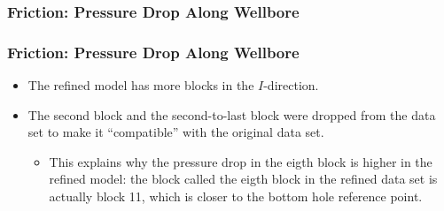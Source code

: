 \begin{frame}
    \frametitle{Friction: Pressure Drop Along Wellbore}
    \centerline{}
\end{frame}

\begin{frame}
    \frametitle{Friction: Pressure Drop Along Wellbore}
    \centerline{}
\end{frame}
\begin{frame}
    \begin{itemize}
        \item The refined model has more blocks in the $I$-direction.
        \item The second block and the second-to-last block were dropped from the data set to make it ``compatible'' with the original data set.
        \begin{itemize}
            \item This explains why the pressure drop in the eigth block is higher in the refined model: the block called the eigth block in the refined data set is actually block 11, which is closer to the bottom hole reference point.
        \end{itemize}
    \end{itemize}
\end{frame}

